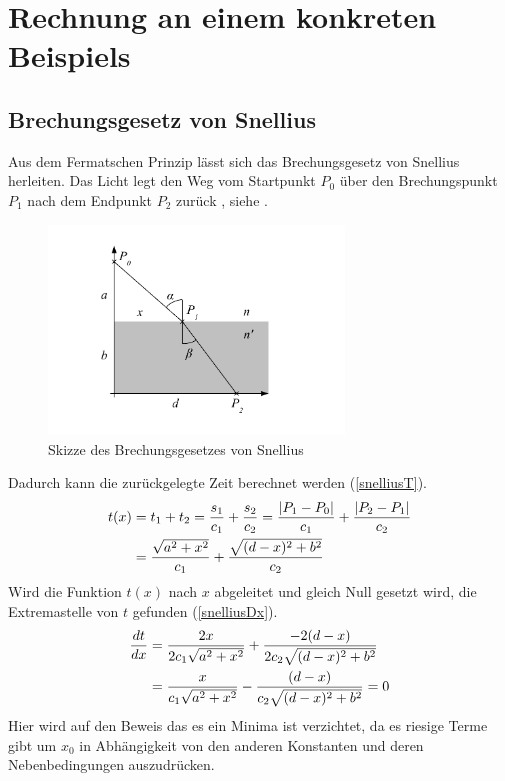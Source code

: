 \section{Rechnung an einem konkreten Beispiels}
\subsection{Brechungsgesetz von Snellius \label{brechungsgesetz}}
Aus dem Fermatschen Prinzip lässt sich das Brechungsgesetz von Snellius herleiten.
Das Licht legt den Weg vom Startpunkt $P_0$ über den Brechungspunkt $P_1$ 
nach dem Endpunkt $P_2$ zurück \cite{Wikipedia}, siehe  .
\begin{figure}[H]
\begin{center}
	\includegraphics[width=0.7\textwidth]{./picture/Brechung.pdf}
	\caption{Skizze des Brechungsgesetzes von Snellius}
	\label{Ab:brechung}
\end{center}
\end{figure}
Dadurch kann die zurückgelegte Zeit berechnet werden (\eqref{snelliusT}).
\begin{align}
t(x) &= t_1 + t_2 = \frac{s_1}{c_1} + \frac{s_2}{c_2} = \frac{|P_1 - P_0|}{c_1} + \frac{|P_2 - P_1|}{c_2} \notag \\
&= \frac{\sqrt{a^2 + x^2}}{c_1} + \frac{\sqrt{(d-x)^2 + b^2}}{c_2} \label{snelliusT}
\end{align}
Wird die Funktion $t(x)$ nach $x$ abgeleitet und gleich Null gesetzt wird, die Extremastelle von $t$ gefunden (\eqref{snelliusDx}).
\begin{align}
	\frac{dt}{dx} &= \frac{2 x}{2  c_1  \sqrt{a^2 + x^2}} + \frac{-2  (d-x)}{2  c_2  \sqrt{(d-x)^2 + b^2}} \notag \\
	&= \frac{x}{c_1 \sqrt{a^2 + x^2}} - \frac{(d-x)}{c_2  \sqrt{(d-x)^2 + b^2}} = 0 
	\label{snelliusDx}
\end{align}
Hier wird auf den Beweis das es ein Minima ist verzichtet, da es riesige Terme gibt um $x_0$ in Abhängigkeit von den anderen Konstanten und deren Nebenbedingungen auszudrücken.
